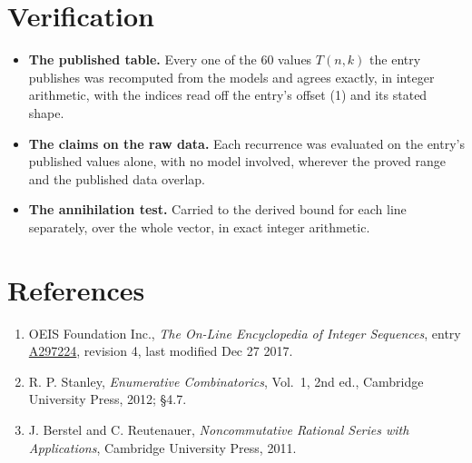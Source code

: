\documentclass[11pt]{article}
\theoremstyle{definition}
\begin{document}
\section{Verification}

\begin{itemize}

\item {\bfseries The published table.} Every one of the 60 values $T(n,k)$ the entry publishes was recomputed from the models and agrees exactly, in integer arithmetic, with the indices read off the entry's offset (1) and its stated shape.

\item {\bfseries The claims on the raw data.} Each recurrence was evaluated on the entry's published values alone, with no model involved, wherever the proved range and the published data overlap.

\item {\bfseries The annihilation test.} Carried to the derived bound for each line separately, over the whole vector, in exact integer arithmetic.

\end{itemize}

\section{References}

\begin{enumerate}

\item OEIS Foundation Inc., \emph{The On-Line Encyclopedia of Integer Sequences}, entry \href{https://oeis.org/A297224}{A297224}, revision 4, last modified Dec 27 2017.

\item R. P. Stanley, \emph{Enumerative Combinatorics}, Vol.~1, 2nd ed., Cambridge University Press, 2012; \S4.7.

\item J. Berstel and C. Reutenauer, \emph{Noncommutative Rational Series with Applications}, Cambridge University Press, 2011.

\end{enumerate}
\end{document}
